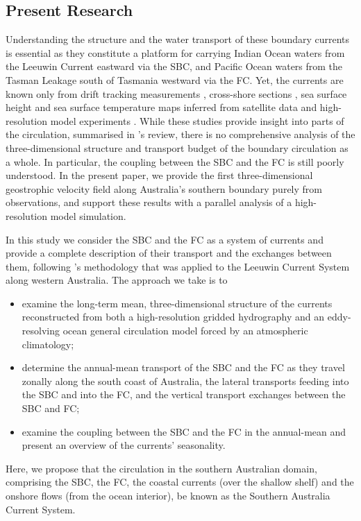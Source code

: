 \documentclass[preprint,3p,review,12pt]{elsarticle}
\newcommand{\citepos}[1]{\citeauthor{#1}'s \citeyearpar{#1}}
\begin{document}
\subsection{Present Research} \label{Present Research}
Understanding the structure and the water transport of these boundary currents is essential as they constitute a platform for carrying Indian Ocean waters from the Leeuwin Current eastward via the SBC, and Pacific Ocean waters from the Tasman Leakage south of Tasmania westward via the FC\@. 
Yet, the currents are known only from drift tracking measurements \citep{Godfrey1986,Cresswell2004}, cross-shore sections \citep{Cresswell1993}, sea surface height and sea surface temperature maps inferred from satellite data \citep{Legeckis1981,Ridgway2004} and high-resolution model experiments \citep{Middleton2002,Middleton2003,Cirano2004,Batteen2009}. While these studies provide insight into parts of the circulation, summarised in \citepos{Middleton2007} review, there is no comprehensive analysis of the three-dimensional structure and transport budget of the boundary circulation as a whole. In particular, the coupling between the SBC and the FC is still poorly understood. In the present paper, we provide the first three-dimensional geostrophic velocity field along Australia's southern boundary purely from observations, and support these results with a parallel analysis of a high-resolution model simulation.

In this study we consider the SBC and the FC as a system of currents and provide a complete description of their transport and the exchanges between them, following \citepos{Furue2017} methodology that was applied to the Leeuwin Current System along western Australia. The approach we take is to
\begin{itemize}
   \item examine the long-term mean, three-dimensional structure of the currents reconstructed from both a high-resolution gridded hydrography and an eddy-resolving ocean general circulation model forced by an atmospheric climatology;
   \item determine the annual-mean transport of the SBC and the FC as they travel zonally along the south coast of Australia, the lateral transports feeding into the SBC and into the FC, and the vertical transport exchanges between the SBC and FC;
   \item examine the coupling between the SBC and the FC in the annual-mean and present an overview of the currents' seasonality.
\end{itemize}
Here, we propose that the circulation in the southern Australian domain, comprising the SBC, the FC, the coastal currents (over the shallow shelf) and the onshore flows (from the ocean interior), be known as the Southern Australia Current System.
\end{document}
